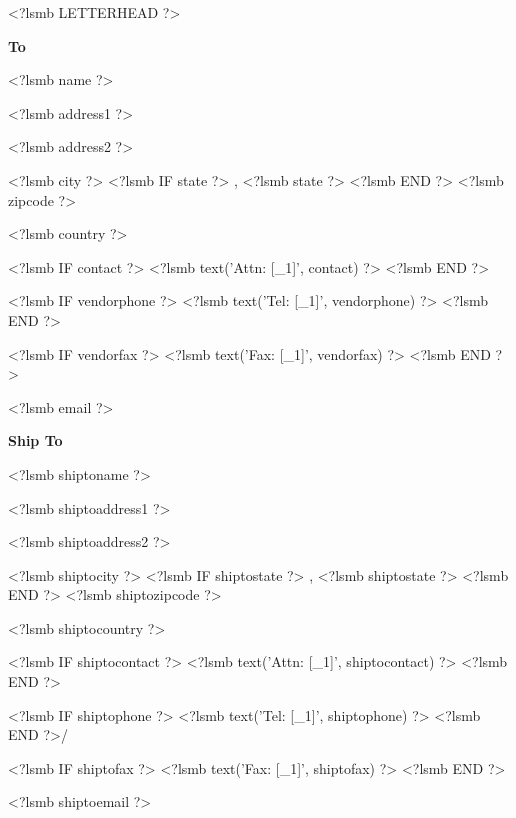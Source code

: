 \documentclass{scrartcl}
\begin{document}
\pagestyle{myheadings}
\thispagestyle{empty}

\fontsize{10pt}{12pt}\selectfont

<?lsmb LETTERHEAD ?>



\vspace*{0.5cm}

\parbox[t]{.5\textwidth}{
\textbf{To}
\vspace{0.3cm}

<?lsmb name ?>

<?lsmb address1 ?>

<?lsmb address2 ?>

<?lsmb city ?>
<?lsmb IF state ?>
\hspace{-0.1cm}, <?lsmb state ?>
<?lsmb END ?>
<?lsmb zipcode ?>

<?lsmb country ?>

\vspace{0.3cm}

<?lsmb IF contact ?>
<?lsmb text('Attn: [_1]', contact) ?>
\vspace{0.2cm}
<?lsmb END ?>

<?lsmb IF vendorphone ?>
<?lsmb text('Tel: [_1]', vendorphone) ?>
<?lsmb END ?>

<?lsmb IF vendorfax ?>
<?lsmb text('Fax: [_1]', vendorfax) ?>
<?lsmb END ?>

<?lsmb email ?>
}
\parbox[t]{.5\textwidth}{
\textbf{Ship To}
\vspace{0.3cm}

<?lsmb shiptoname ?>

<?lsmb shiptoaddress1 ?>

<?lsmb shiptoaddress2 ?>

<?lsmb shiptocity ?>
<?lsmb IF shiptostate ?>
\hspace{-0.1cm}, <?lsmb shiptostate ?>
<?lsmb END ?>
<?lsmb shiptozipcode ?>

<?lsmb shiptocountry ?>

\vspace{0.3cm}

<?lsmb IF shiptocontact ?>
<?lsmb text('Attn: [_1]', shiptocontact) ?>
\vspace{0.2cm}
<?lsmb END ?>

<?lsmb IF shiptophone ?>
<?lsmb text('Tel: [_1]', shiptophone) ?>
<?lsmb END ?>/

<?lsmb IF shiptofax ?>
<?lsmb text('Fax: [_1]', shiptofax) ?>
<?lsmb END ?>

<?lsmb shiptoemail ?>
}
\hfill
\end{document}
